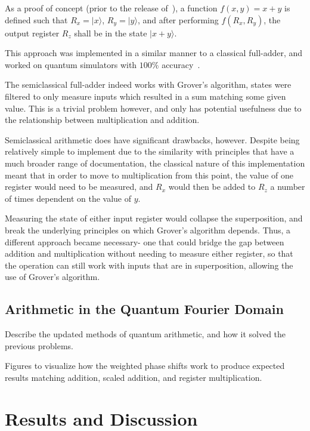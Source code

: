 \documentclass[twocolumn]{cinc}
\begin{document}
  As a proof of concept (prior to the release of~\cite{quantum_factoring}),
  a function $f(x,y)=x+y$ is defined such that $R_x=|x\rangle$, $R_y=|y\rangle$,
  and after performing $f(R_x,R_y)$, the output register $R_z$ shall be in the
  state $|x+y\rangle$.
  
  This approach was implemented in a similar manner to a classical full-adder,
  and worked on quantum simulators with $100\%$ accuracy~\cite{quantum_full_adder}.

  The semiclassical full-adder indeed works with Grover's algorithm, states were
  filtered to only measure inputs which resulted in a sum matching some given value.
  This is a trivial problem however, and only has potential usefulness due to the 
  relationship between multiplication and addition.

  Semiclassical arithmetic does have significant drawbacks, however. Despite
  being relatively simple to implement due to the similarity with principles
  that have a much broader range of documentation, the classical nature of this
  implementation meant that in order to move to multiplication from this point,
  the value of one register would need to be measured, and $R_x$ would then be
  added to $R_z$ a number of times dependent on the value of $y$.

  Measuring the state of either input register would collapse the superposition,
  and break the underlying principles on which Grover's algorithm depends. Thus,
  a different approach became necessary- one that could bridge the gap between 
  addition and multiplication without needing to measure either register,
  so that the operation can still work with inputs that are in superposition,
  allowing the use of Grover's algorithm.

  \subsection{Arithmetic in the Quantum Fourier Domain}  

  Describe the updated methods of quantum arithmetic, and how it solved the 
  previous problems.

  Figures to visualize how the weighted phase shifts work to produce
  expected results matching addition, scaled addition, and register 
  multiplication.

\section{Results and Discussion}
\end{document}
